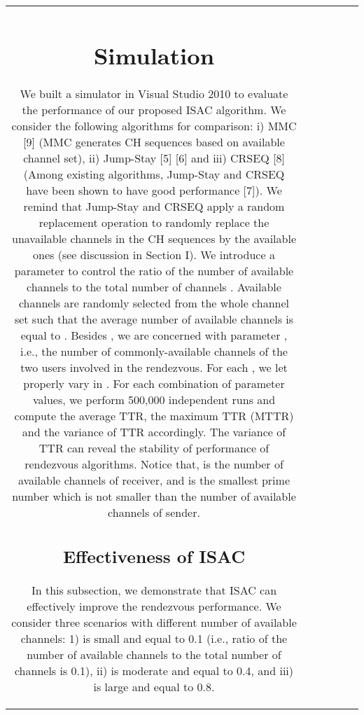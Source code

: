 \documentclass[journal]{IEEEtran}
\begin{document}
\begin{table*}
\begin{tabular}{|c|c|c|c|c|c|}
{\section{Simulation}
We built a simulator in Visual Studio 2010 to evaluate the performance of our proposed ISAC algorithm. We consider the following algorithms for comparison: i) MMC [9] (MMC generates CH sequences based on available channel set), ii) Jump-Stay [5] [6] and iii) CRSEQ [8] (Among existing algorithms, Jump-Stay and CRSEQ have been shown to have good performance [7]). We remind that Jump-Stay and CRSEQ apply a random replacement operation to randomly replace the unavailable channels in the CH sequences by the available ones (see discussion in Section I). We introduce a parameter  to control the ratio of the number of available channels to the total number of channels . Available channels are randomly selected from the whole channel set such that the average number of available channels is equal to . Besides , we are concerned with parameter , i.e., the number of commonly-available channels of the two users involved in the rendezvous. For each , we let  properly vary in . For each combination of parameter values, we perform 500,000 independent runs and compute the average TTR, the maximum TTR (MTTR) and the variance of TTR accordingly. The variance of TTR can reveal the stability of performance of rendezvous algorithms. Notice that,  is the number of available channels of receiver, and  is the smallest prime number which is not smaller than the number of available channels of sender.
\subsection{Effectiveness of ISAC}
In this subsection, we demonstrate that  ISAC can effectively improve the rendezvous performance. We consider three scenarios with different number of available channels: 1)  is small and equal to 0.1 (i.e., ratio of the number of available channels to the total number of channels is 0.1), ii)  is moderate and equal to 0.4, and iii)  is large and equal to 0.8.
}
\end{tabular}
\end{table*}
\end{document}
